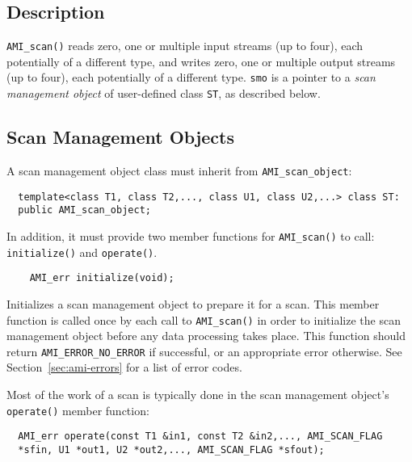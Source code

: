 \subsection{Description}

\lstinline|AMI_scan()| reads zero, one or multiple input streams (up
to four), each potentially of a different type, and writes zero, one
or multiple output streams (up to four), each potentially of a
different type.  \lstinline|smo| is a pointer to a {\em scan
  management object} of user-defined class \lstinline|ST|, as
described below.

\subsection{Scan Management Objects}


A scan management object class must inherit from
\lstinline|AMI_scan_object|:
\begin{lstlisting}
  template<class T1, class T2,..., class U1, class U2,...> class ST:
  public AMI_scan_object;
\end{lstlisting}
In addition, it must provide two member functions for
\lstinline|AMI_scan()| to call: \lstinline|initialize()| and
\lstinline|operate()|.  
\begin{lstlisting}
    AMI_err initialize(void);
\end{lstlisting}
    Initializes a scan management object to prepare
    it for a scan.  This member function is called once by
    each call to \lstinline|AMI_scan()| in order to initialize
    the scan management object before any data processing
    takes place.  This function should return
    \lstinline|AMI_ERROR_NO_ERROR| if successful, or an
    appropriate error otherwise. See
    Section~\ref{sec:ami-errors} for a list of error codes.
    
 Most of the work of a scan is
typically done in the scan management object's \lstinline|operate()|
member function:
\begin{lstlisting}
  AMI_err operate(const T1 &in1, const T2 &in2,..., AMI_SCAN_FLAG
  *sfin, U1 *out1, U2 *out2,..., AMI_SCAN_FLAG *sfout);
\end{lstlisting}
    
